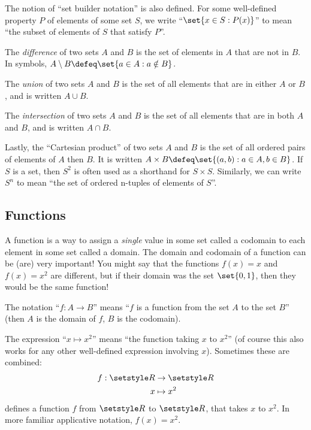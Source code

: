 The notion of ``set builder notation'' is also defined. For some well-defined
property \(P\) of elements of some set \(S\), we write
``\(\set{x \in S: P(x)}\)'' to mean ``the subset of elements of \(S\) that
satisfy \(P\)''.

The \emph{difference} of two sets \(A\) and \(B\) is the set of elements in
\(A\) that are not in \(B\). In symbols,
\(A \setminus B \defeq \set{a \in A : a \notin B}\).

The \emph{union} of two sets \(A\) and \(B\) is the set of all elements that are
in either \(A\) or \(B\), and is written \(A \cup B\).

The \emph{intersection} of two sets \(A\) and \(B\) is the set of all elements
that are in both \(A\) and \(B\), and is written \(A \cap B\).

Lastly, the ``Cartesian product'' of two sets \(A\) and \(B\) is the set of all
ordered pairs of elements of \(A\) then \(B\). It is written
\(A \times B \defeq \set{(a, b) : a \in A, b \in B}\). If \(S\) is a set, then
\(S^2\) is often used as a shorthand for \(S \times S\). Similarly, we can write
\(S^n\) to mean ``the set of ordered n-tuples of elements of \(S\)''.

\subsection{Functions}

A function is a way to assign a \emph{single} value in some set called a
codomain to each element in some set called a domain. The domain and codomain of
a function can be (are) very important! You might say that the functions \(f(x)
= x\) and \(f(x) = x^2\) are different, but if their domain was the set
\(\set{0, 1}\), then they would be the same function!

The notation ``\(f: A \to B\)'' means ``\(f\) is a function from the set \(A\)
to the set \(B\)'' (then \(A\) is the domain of \(f\), \(B\) is the codomain).

The expression ``\(x \mapsto x^2\)'' means ``the function taking \(x\) to
\(x^2\)'' (of course this also works for any other well-defined expression
involving \(x\)). Sometimes these are combined:
\begin{align*}
 f: \Reals &\to \Reals \\
    x &\mapsto x^2
\end{align*}
defines a function \(f\) from \(\Reals\) to \(\Reals\), that takes \(x\) to
\(x^2\). In more familiar applicative notation, \(f(x) = x^2\).

